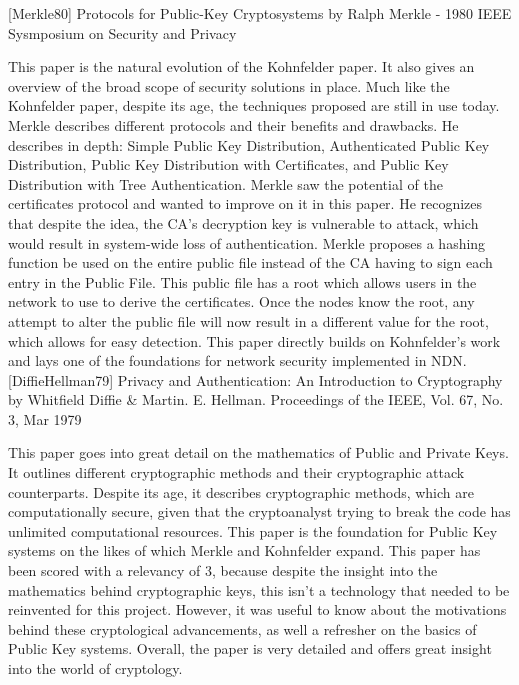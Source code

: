 [Merkle80] Protocols for Public-Key Cryptosystems by Ralph Merkle - 1980 IEEE Sysmposium on Security and Privacy

This paper is the natural evolution of the Kohnfelder paper. It also gives an overview of the broad scope of security solutions in place. Much like the Kohnfelder paper, despite its age, the techniques proposed are still in use today. Merkle describes different protocols and their benefits and drawbacks. He describes in depth: Simple Public Key Distribution, Authenticated Public Key Distribution, Public Key Distribution with Certificates, and Public Key Distribution with Tree Authentication. Merkle saw the potential of the certificates protocol and wanted to improve on it in this paper. He recognizes that despite the idea, the CA's decryption key is vulnerable to attack, which would result in system-wide loss of authentication. Merkle proposes a hashing function be used on the entire public file instead of the CA having to sign each entry in the Public File. This public file has a root which allows users in the network to use to derive the certificates. Once the nodes know the root, any attempt to alter the public file will now result in a different value for the root, which allows for easy detection. This paper directly builds on Kohnfelder's work and lays one of the foundations for network security implemented in NDN.  \\

[DiffieHellman79] Privacy and Authentication: An Introduction to Cryptography by  Whitfield Diffie \& Martin. E. Hellman. Proceedings of the IEEE, Vol. 67, No. 3, Mar 1979

This paper goes into great detail on the mathematics of Public and Private Keys. It outlines different cryptographic methods and their cryptographic attack counterparts. Despite its age, it describes cryptographic methods, which are computationally secure, given that the cryptoanalyst trying to break the code has unlimited computational resources. This paper is the foundation for Public Key systems on the likes of which Merkle and Kohnfelder expand. This paper has been scored with a relevancy of 3, because despite the insight into the mathematics behind cryptographic keys, this isn't a technology that needed to be reinvented for this project. However, it was useful to know about the motivations behind these cryptological advancements, as well a refresher on the basics of Public Key systems. Overall, the paper is very detailed and offers great insight into the world of cryptology.

